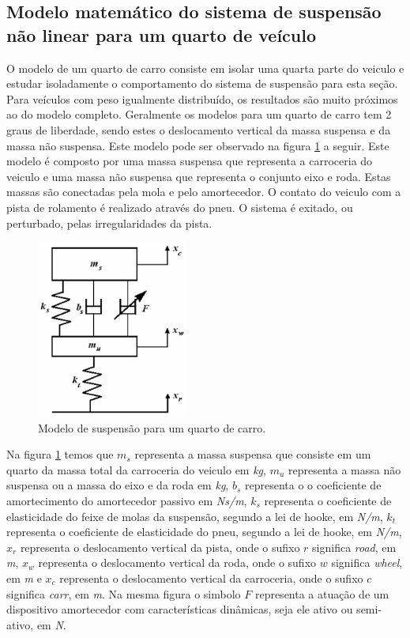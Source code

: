 \documentclass[a4paper]{ifacconf}
\begin{document}
    \subsection{Modelo matemático do sistema de suspensão não linear para um quarto de veículo }
    O modelo de um quarto de carro consiste em isolar uma quarta parte do veiculo e estudar isoladamente o comportamento do sistema de suspensão para esta seção. Para veículos com peso igualmente distribuído, os resultados são muito próximos ao do modelo completo. Geralmente os modelos para um quarto de carro tem 2 graus de liberdade, sendo estes o deslocamento vertical da massa suspensa e da massa não suspensa. Este modelo pode ser observado na figura \ref{fig:massa_mola_nao_linear_controlavel} a seguir. Este modelo é composto por uma massa suspensa que representa a carroceria do veiculo e uma massa não suspensa que representa o conjunto eixo e roda. Estas massas são conectadas pela mola e pelo amortecedor. O contato do veiculo com a pista de rolamento é realizado através do pneu. O sistema é exitado, ou perturbado, pelas irregularidades da pista.
    \FloatBarrier
    \begin{figure}[htbp]
        \begin{centering}
            \includegraphics[width=5cm]{img/massa_mola_nao_linear_controlavel.png}
            \caption{Modelo de suspensão para um quarto de carro.} 
            \label{fig:massa_mola_nao_linear_controlavel}
        \end{centering}
    \end{figure}
    \FloatBarrier
    Na figura \ref{fig:massa_mola_nao_linear_controlavel} temos que $m_s$ representa a massa suspensa que consiste em um quarto da massa total da carroceria do veiculo em \emph{kg}, $m_u$ representa a massa não suspensa ou a massa do eixo e da roda em \emph{kg}, $b_s$ representa o o coeficiente de amortecimento do amortecedor passivo em \emph{Ns/m}, $k_s$ representa o coeficiente de elasticidade do feixe de molas da suspensão, segundo a lei de hooke, em \emph{N/m}, $k_t$ representa o coeficiente de elasticidade do pneu, segundo a lei de hooke, em \emph{N/m}, $x_r$ representa o deslocamento vertical da pista, onde o sufixo $r$ significa \emph{road}, em \emph{m}, $x_w$ representa o deslocamento vertical da roda, onde o sufixo $w$ significa \emph{wheel}, em \emph{m} e $x_c$ representa o deslocamento vertical da carroceria, onde o sufixo $c$ significa \emph{carr}, em \emph{m}. Na mesma figura o simbolo $F$ representa a atuação de um dispositivo amortecedor com características dinâmicas, seja ele ativo ou semi-ativo, em \emph{N}.
    
\end{document}
